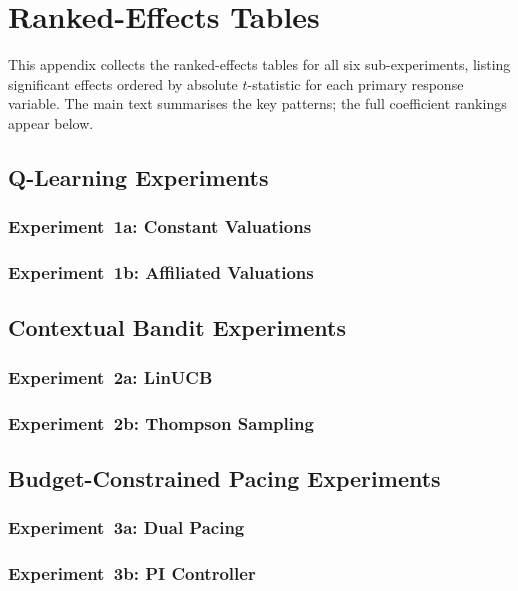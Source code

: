 \chapter{Ranked-Effects Tables}
\label{ch:ranked_tables}

This appendix collects the ranked-effects tables for all six sub-experiments, listing significant effects ordered by absolute $t$-statistic for each primary response variable. The main text summarises the key patterns; the full coefficient rankings appear below.

\section{Q-Learning Experiments}

\subsection{Experiment~1a: Constant Valuations}



\subsection{Experiment~1b: Affiliated Valuations}



\section{Contextual Bandit Experiments}

\subsection{Experiment~2a: LinUCB}



\subsection{Experiment~2b: Thompson Sampling}



\section{Budget-Constrained Pacing Experiments}

\subsection{Experiment~3a: Dual Pacing}





\subsection{Experiment~3b: PI Controller}




